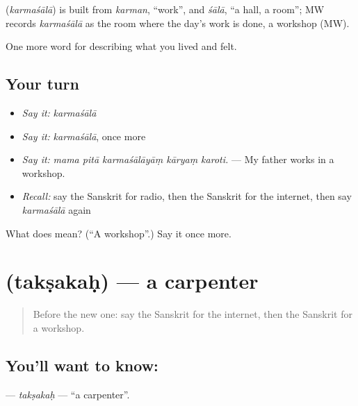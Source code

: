 \begin{cousinweb}
\textbf{} (\emph{karmaśālā}) is built from \emph{karman}, \textquotedblleft{}work\textquotedblright{}, and \emph{śālā}, \textquotedblleft{}a hall, a room\textquotedblright{}; MW records \emph{karmaśālā} as the room where the day's work is done, a workshop (MW).
\end{cousinweb}

\begin{grammarlens}[title={What you've built}]
One more word for describing what you lived and felt.
\end{grammarlens}

\subsection*{Your turn}
\begin{itemize}
\raggedright
  \item \emph{Say it:} \emph{karmaśālā}
  \item \emph{Say it:} \emph{karmaśālā}, once more
  \item \emph{Say it:} \emph{mama pitā karmaśālāyāṃ kāryaṃ karoti.} — My father works in a workshop.
  \item \emph{Recall:} say the Sanskrit for radio, then the Sanskrit for the internet, then say \emph{karmaśālā} again
\end{itemize}

\begin{tcolorbox}[breakable,colback=teal!4,colframe=teal!35!black,title={Before you move on}]
What does  mean? (\textquotedblleft{}A workshop\textquotedblright{}.) Say it once more.
\end{tcolorbox}
\section[\texorpdfstring{\sk{तक्षकः} (takṣakaḥ)}{तक्षकः (takṣakaḥ)}]{ (takṣakaḥ) — a carpenter}

\label{lesson:SA-C502-taksakah}



\begin{quote}
Before the new one: say the Sanskrit for the internet, then the Sanskrit for a workshop.
\end{quote}

\subsection*{You'll want to know: }
\textbf{} — \emph{takṣakaḥ} — \textquotedblleft{}a carpenter\textquotedblright{}.

